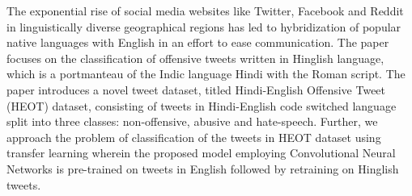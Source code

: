 The exponential rise of social media websites like Twitter, Facebook and Reddit in linguistically diverse geographical regions has led to hybridization of popular native languages with English in an effort to ease communication. The paper focuses on the classification of offensive tweets written in Hinglish language, which is a portmanteau of the Indic language Hindi with the Roman script. The paper introduces a novel tweet dataset, titled Hindi-English Offensive Tweet (HEOT) dataset, consisting of tweets in Hindi-English code switched language split into three classes: non-offensive, abusive and hate-speech. Further, we approach the problem of classification of the tweets in HEOT dataset using transfer learning wherein the proposed model employing Convolutional Neural Networks is pre-trained on tweets in English followed by retraining on Hinglish tweets.
